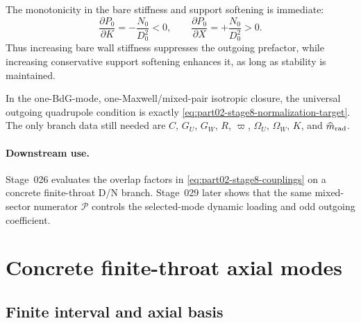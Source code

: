 The monotonicity in the bare stiffness and support softening is immediate:
\begin{equation}
\label{eq:part02-stage8-monotonicity}
\frac{\partial P_0}{\partial K}=-\frac{N_0}{D_0^2}<0,
\qquad
\frac{\partial P_0}{\partial X}=+\frac{N_0}{D_0^2}>0.
\end{equation}
Thus increasing bare wall stiffness suppresses the outgoing prefactor, while increasing conservative support softening enhances it, as long as stability is maintained.

\begin{proposition}
\label{prop:part02-minimal-normalization}
In the one-BdG-mode, one-Maxwell/mixed-pair isotropic closure, the universal outgoing quadrupole condition is exactly \eqref{eq:part02-stage8-normalization-target}.  The only branch data still needed are \(C\), \(G_U\), \(G_W\), \(R\), \(\varpi\), \(\Omega_U\), \(\Omega_W\), \(K\), and \(\widehat m_{\rm rad}\).
\end{proposition}

\paragraph{Downstream use.}
Stage~026 evaluates the overlap factors in \eqref{eq:part02-stage8-couplings} on a concrete finite-throat D/N branch.  Stage~029 later shows that the same mixed-sector numerator \(\mathcal P\) controls the selected-mode dynamic loading and odd outgoing coefficient.

\section{Concrete finite-throat axial modes}
\label{sec:part02_conservative_response:concrete-finite-throat-axial-modes}

\subsection{Finite interval and axial basis}
\label{subsec:part02-stage026-axial-basis}


